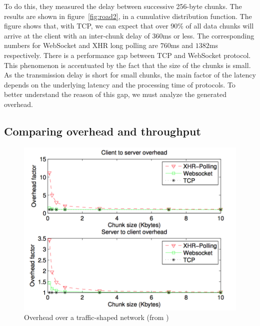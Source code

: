 \documentclass[10pt,journal,compsoc]{IEEEtran}
\newcommand{\ws}{WebSocket}
\begin{document}
To do this, they measured the delay between successive 256-byte chunks. %
The results are shown in figure~\ref{fig:road2}, in a cumulative distribution function.
The figure shows that, with TCP, we can expect that over 90\% of all data chunks will arrive at the client with an inter-chunk delay of 360ms or less. The corresponding numbers for \ws{} and XHR long polling are $760$ms and $1382$ms respectively. %
There is a performance gap between TCP and \ws{} protocol.
This phenomenon is accentuated by the fact that the size of the chunks is small.
As the transmission delay is short for small chunks, the main factor of the latency depends on the underlying latency and the processing time of protocols.
To better understand the reason of this gap, we must analyze the generated overhead.

\subsection{Comparing overhead and throughput}

\begin{figure}[!ht]
    \centering
    \includegraphics[width=\linewidth]{road4.png}
    \caption{Overhead over a traffic-shaped network (from \cite{roadblock})}
    \label{fig:road4}
\end{figure}
\end{document}
